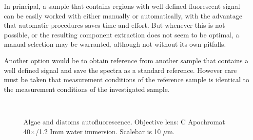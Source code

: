In principal, a sample that contains regions with well defined fluorescent signal can be easily worked with either manually or automatically, with the advantage that automatic procedures saves time and effort. 
But whenever this is not possible, or the resulting component extraction does not seem to be optimal, a manual selection may be warranted, although not without its own pitfalls. 

Another option would be to obtain reference from another sample that contains a well defined signal and save the spectra as a standard reference. However care must be taken that measurement conditions of the reference sample is identical to the measurement conditions of the investigated sample. 

\begin{figure}[h!]
\centering
{}\hspace{0.1em}
\hspace{0.1em}
\\
\caption{Algae and diatoms autofluorescence. 
Objective lens: C Apochromat 40$\times$/1.2 Imm water immersion. 
Scalebar is 10 $\mu$m.}
\label{fig:diatalg}
\end{figure}


